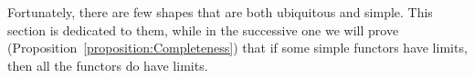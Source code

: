 Fortunately, there are few shapes that are both ubiquitous and
simple. This section is dedicated to them, while in the successive one
we will prove (Proposition~\ref{proposition:Completeness}) that if
some simple functors have limits, then all the functors do have
limits.

